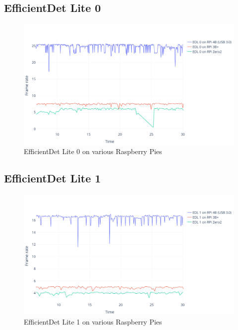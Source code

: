\subsection{EfficientDet Lite 0}
\begin{figure}[H]
    \centering
    \includegraphics[width=\textwidth]{fig/plots/EDL0.png}
    \caption{EfficientDet Lite 0 on various Raspberry Pies}
    \label{fig:edl0}
\end{figure}

\newpage

\subsection{EfficientDet Lite 1}
\begin{figure}[H]
    \centering
    \includegraphics[width=\textwidth]{fig/plots/EDL1.png}
    \caption{EfficientDet Lite 1 on various Raspberry Pies}
    \label{fig:edl1}
\end{figure}

\newpage

